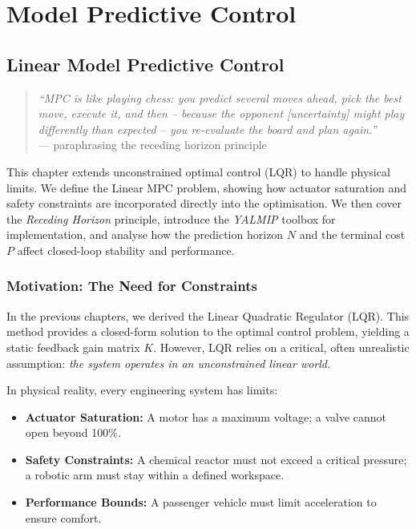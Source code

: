 \part{Model Predictive Control}

\chapter{Linear Model Predictive Control}
\label{chap:linear_mpc}

\begin{quote}
	\textit{``MPC is like playing chess: you predict several moves ahead, pick the best move, execute it, and then -- because the opponent [uncertainty] might play differently than expected -- you re-evaluate the board and plan again.''} \\
	\hfill --- paraphrasing the receding horizon principle
\end{quote}

This chapter extends unconstrained optimal control (LQR) to handle physical limits. We define the Linear MPC problem, showing how actuator saturation and safety constraints are incorporated directly into the optimisation. We then cover the \emph{Receding Horizon} principle, introduce the \emph{YALMIP} toolbox for implementation, and analyse how the prediction horizon $N$ and the terminal cost $P$ affect closed-loop stability and performance.

\section{Motivation: The Need for Constraints}

In the previous chapters, we derived the Linear Quadratic Regulator (LQR). This method provides a closed-form solution to the optimal control problem, yielding a static feedback gain matrix $K$. However, LQR relies on a critical, often unrealistic assumption: \emph{the system operates in an unconstrained linear world.}

In physical reality, every engineering system has limits:
\begin{itemize}
	\item \textbf{Actuator Saturation:} A motor has a maximum voltage; a valve cannot open beyond 100\%.
	\item \textbf{Safety Constraints:} A chemical reactor must not exceed a critical pressure; a robotic arm must stay within a defined workspace.
	\item \textbf{Performance Bounds:} A passenger vehicle must limit acceleration to ensure comfort.
\end{itemize}

